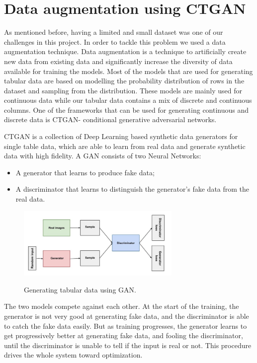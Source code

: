 \documentclass{article}
\numberwithin{equation}{subsection}
\begin{document}
\section{Data augmentation using CTGAN}

As mentioned before, having a limited and small dataset was one of our challenges in this project. In order to tackle this problem we used a data augmentation technique. Data augmentation is a technique to artificially create new data from existing data and significantly increase the diversity of data available for training the models. Most of the models that are used for generating tabular data are based on modelling the probability distribution of rows in the dataset and sampling from the distribution. These models are mainly used for continuous data while our tabular data contains a mix of discrete and continuous columns. One of the frameworks that can be used for generating continuous and discrete data is CTGAN- conditional generative adversarial networks.

CTGAN is a collection of Deep Learning based synthetic data generators for single table data, which are able to learn from real data and generate synthetic data with high fidelity. A GAN consists of two Neural Networks:
\begin{itemize}
	\item A generator that learns to produce fake data;
	\item A discriminator that learns to distinguish the generator’s fake data from the real data.
\end{itemize} 

\begin{figure}[H]
		{\centering
		  {\includegraphics[width = 0.7\textwidth]{CTGAN}
		  }
		  \par}
		\caption{Generating tabular data using GAN.}
		\label{fig:carbon}
		\end{figure}

The two models compete against each other. At the start of the training, the generator is not very good at generating fake data, and the discriminator is able to catch the fake data easily. But as training progresses, the generator learns to get progressively better at generating fake data, and fooling the discriminator, until the discriminator is unable to tell if the input is real or not. This procedure drives the whole system toward optimization.
\end{document}
